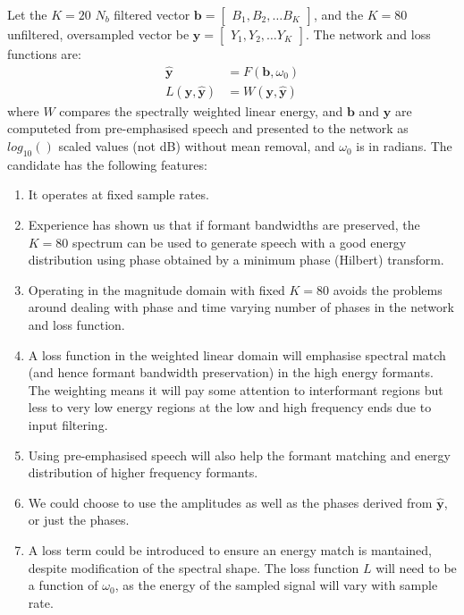\documentclass{article}
\begin{document}
Let the $K=20$ $N_b$ filtered vector $\mathbf{b} = \begin{bmatrix} B_1, B_2, \ldots B_K \end{bmatrix}$, and the $K=80$ unfiltered, oversampled vector be $\mathbf{y} = \begin{bmatrix} Y_1, Y_2, \ldots Y_K \end{bmatrix}$. The network and loss functions are:
\begin{equation}
\begin{split}
\hat{\mathbf{y}} &= F(\mathbf{b},\omega_0) \\
L(\mathbf{y},\hat{\mathbf{y}}) &= W(\mathbf{y},\hat{\mathbf{y}})
\end{split}
\end{equation}
where $W$ compares the spectrally weighted linear energy, and $\mathbf{b}$ and $\mathbf{y}$ are computeted from pre-emphasised speech and presented to the network as $log_10()$ scaled values (not dB) without mean removal, and $\omega_0$ is in radians.  The candidate has the following features:
\begin{enumerate}
\item It operates at fixed sample rates.
\item Experience has shown us that if formant bandwidths are preserved, the $K=80$ spectrum can be used to generate speech with a good energy distribution using phase obtained by a minimum phase (Hilbert) transform.
\item Operating in the magnitude domain with fixed $K=80$ avoids the problems around dealing with phase and time varying number of phases in the network and loss function.
\item A loss function in the weighted linear domain will emphasise spectral match (and hence formant bandwidth preservation) in the high energy formants.  The weighting means it will pay some attention to interformant regions but less to very low energy regions at the low and high frequency ends due to input filtering.
\item Using pre-emphasised speech will also help the formant matching and energy distribution of higher frequency formants.
\item We could choose to use the amplitudes as well as the phases derived from $\hat{\mathbf{y}}$, or just the phases.
\item A loss term could be introduced to ensure an energy match is mantained, despite modification of the spectral shape.  The loss function $L$ will need to be a function of $\omega_0$, as the energy of the sampled signal will vary with sample rate.
\end{enumerate}
\end{document}
